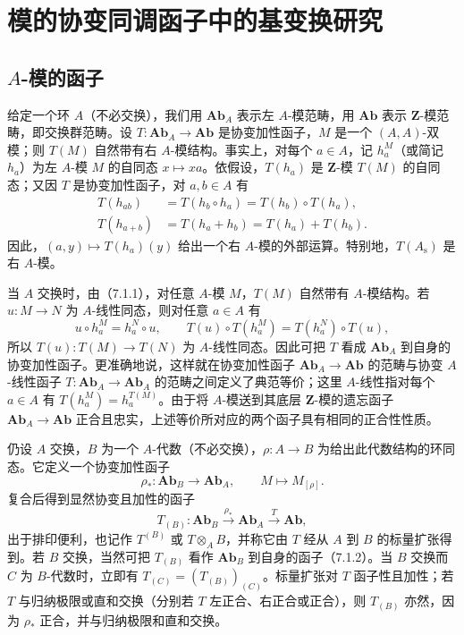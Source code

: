 \section{模的协变同调函子中的基变换研究}
\subsection{\texorpdfstring{$A$-模的函子}{A-模的函子}}

给定一个环 $A$（不必交换），我们用 $\mathbf{Ab}_A$ 表示左 $A$-模范畴，用 $\mathbf{Ab}$ 表示 $\mathbf Z$-模范畴，即交换群范畴。设 $T:\mathbf{Ab}_A\to\mathbf{Ab}$ 是协变加性函子，$M$ 是一个 $(A,A)$-双模；则 $T(M)$ 自然带有右 $A$-模结构。事实上，对每个 $a\in A$，记 $h_a^M$（或简记 $h_a$）为左 $A$-模 $M$ 的自同态 $x\mapsto xa$。依假设，$T(h_a)$ 是 $\mathbf Z$-模 $T(M)$ 的自同态；又因 $T$ 是协变加性函子，对 $a,b\in A$ 有
\[
\begin{aligned}
 T(h_{ab})&=T(h_b\circ h_a)=T(h_b)\circ T(h_a),\\
 T(h_{a+b})&=T(h_a+h_b)=T(h_a)+T(h_b).
\end{aligned}
\]
因此，$(a,y)\mapsto T(h_a)(y)$ 给出一个右 $A$-模的外部运算。特别地，$T(A_{\mathrm s})$ 是右 $A$-模。

当 $A$ 交换时，由（7.1.1），对任意 $A$-模 $M$，$T(M)$ 自然带有 $A$-模结构。若 $u:M\to N$ 为 $A$-线性同态，则对任意 $a\in A$ 有
\[
 u\circ h_a^M=h_a^N\circ u,
 \qquad T(u)\circ T(h_a^M)=T(h_a^N)\circ T(u),
\]
所以 $T(u):T(M)\to T(N)$ 为 $A$-线性同态。因此可把 $T$ 看成 $\mathbf{Ab}_A$ 到自身的协变加性函子。更准确地说，这样就在协变加性函子 $\mathbf{Ab}_A\to\mathbf{Ab}$ 的范畴与协变 $A$-线性函子 $T:\mathbf{Ab}_A\to\mathbf{Ab}_A$ 的范畴之间定义了典范等价；这里 $A$-线性指对每个 $a\in A$ 有 $T(h_a^M)=h_a^{T(M)}$。由于将 $A$-模送到其底层 $\mathbf Z$-模的遗忘函子 $\mathbf{Ab}_A\to\mathbf{Ab}$ 正合且忠实，上述等价所对应的两个函子具有相同的正合性性质。

仍设 $A$ 交换，$B$ 为一个 $A$-代数（不必交换），$\rho:A\to B$ 为给出此代数结构的环同态。它定义一个协变加性函子
\[
 \rho_*:\mathbf{Ab}_B\longrightarrow\mathbf{Ab}_A,
 \qquad M\longmapsto M_{[\rho]}.
\]
复合后得到显然协变且加性的函子
\[
 T_{(B)}:\mathbf{Ab}_B\xrightarrow{\rho_*}\mathbf{Ab}_A
 \xrightarrow{T}\mathbf{Ab},
\]
出于排印便利，也记作 $T^{(B)}$ 或 $T\otimes_A B$，并称它由 $T$ 经从 $A$ 到 $B$ 的标量扩张得到。若 $B$ 交换，当然可把 $T_{(B)}$ 看作 $\mathbf{Ab}_B$ 到自身的函子（7.1.2）。当 $B$ 交换而 $C$ 为 $B$-代数时，立即有 $T_{(C)}=(T_{(B)})_{(C)}$。标量扩张对 $T$ 函子性且加性；若 $T$ 与归纳极限或直和交换（分别若 $T$ 左正合、右正合或正合），则 $T_{(B)}$ 亦然，因为 $\rho_*$ 正合，并与归纳极限和直和交换。

